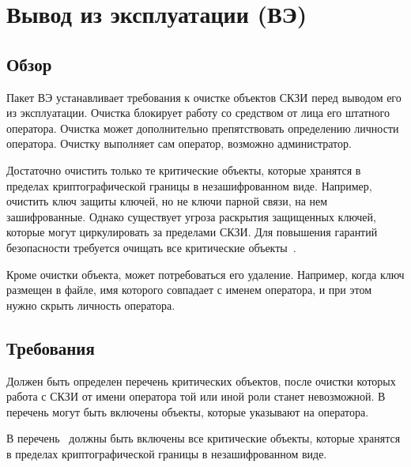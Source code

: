 \section{Вывод из эксплуатации (ВЭ)}\label{DE}

\subsection{Обзор}\label{DE.Intro}

Пакет ВЭ устанавливает требования к очистке объектов СКЗИ перед
выводом его из эксплуатации. Очистка блокирует работу со средством от  
лица его штатного оператора. Очистка может дополнительно препятствовать 
определению личности оператора. Очистку выполняет сам оператор,
возможно администратор.

Достаточно очистить только те критические объекты, которые хранятся в 
пределах криптографической границы в незашифрованном виде.
%
Например, очистить ключ защиты ключей, но не ключи парной связи, на нем 
зашифрованные.
%
Однако существует угроза раскрытия защищенных ключей, которые могут 
циркулировать за пределами СКЗИ. Для повышения гарантий безопасности требуется 
очищать все критические объекты~.

Кроме очистки объекта, может потребоваться его удаление. Например, когда ключ 
размещен в файле, имя которого совпадает с именем оператора, и при этом нужно 
скрыть личность оператора.


\subsection{Требования}\label{DE.Reqs}

\label{R.DE.List} %
Должен быть определен перечень критических объектов, 
после очистки которых работа с СКЗИ от имени оператора
той или иной роли станет невозможной. 
%
В перечень могут быть включены объекты, которые указывают на оператора.

\label{R.DE.Short} %
В перечень~ должны быть включены все критические объекты,
которые хранятся в пределах криптографической границы в незашифрованном виде.


